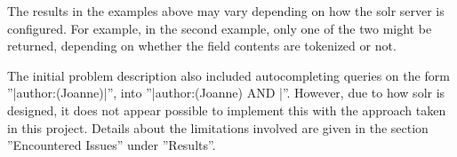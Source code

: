 The results in the examples above may vary depending on how the solr server is configured. For example, in the second example, only one of the two might be returned, depending on whether the field contents are tokenized or not. 

The initial problem description also included autocompleting queries on the form  ''|author:(Joanne)|'', into ''|author:(Joanne) AND |''. However, due to how solr is designed, it does not appear possible to implement this with the approach taken in this project. Details about the limitations involved are given in the section ''Encountered Issues'' under ''Results''.



